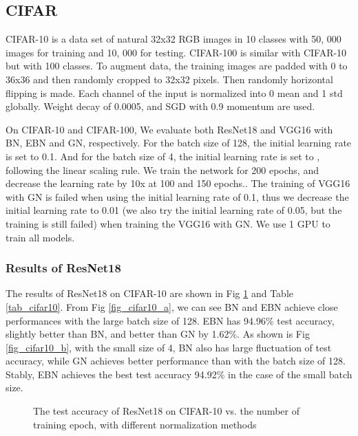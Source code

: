 \documentclass[runningheads]{llncs}
\begin{document}
\subsection{CIFAR}


CIFAR-10 \cite{krizhevsky2009learning} is a data set of natural 32x32 RGB images in 10 classes with 50, 000 images for training and 10, 000 for testing. CIFAR-100 is similar with CIFAR-10 but with 100 classes. To augment data, the training images are padded with 0 to 36x36 and then randomly cropped to 32x32 pixels. Then randomly horizontal flipping is made. Each channel of the input is normalized into 0 mean and 1 std globally. Weight decay of 0.0005, and SGD with 0.9 momentum are used. 



On CIFAR-10 and CIFAR-100, We evaluate both ResNet18 \cite{he2016deep} and VGG16 \cite{simonyan2014very} with BN, EBN and GN, respectively. For the batch size of 128, the initial learning rate is set to 0.1. And for the batch size of 4, the initial learning rate is set to , following the linear scaling rule. We train the network for 200 epochs, and decrease the learning rate by 10x at 100 and 150 epochs.. The training of VGG16 with GN is failed when using the initial learning rate of 0.1, thus we decrease the initial learning rate to 0.01 (we also try the initial learning rate of 0.05, but the training is still failed) when training the VGG16 with GN. We use 1 GPU to train all models.

\subsubsection{Results of ResNet18}
The results of ResNet18 on CIFAR-10 are shown in Fig \ref{fig_cifar10}  and Table \ref{tab_cifar10}. From Fig \ref{fig_cifar10_a}, we can see BN and EBN achieve close performances with the large batch size of 128. EBN has 94.96\%  test accuracy, slightly better than BN, and better than GN by 1.62\%. As shown is Fig \ref{fig_cifar10_b}, with the small size of 4, BN  also has large fluctuation of test accuracy, while GN achieves better performance than with the batch size of 128.  Stably, EBN achieves the best test accuracy 94.92\% in the case of the small batch size. 


\begin{figure}[!htb]
\centering
{}
\centering
{}
\caption{The test accuracy of ResNet18 on CIFAR-10 vs. the number of training epoch, with different normalization methods}
\label{fig_cifar10}
\end{figure}
\end{document}
